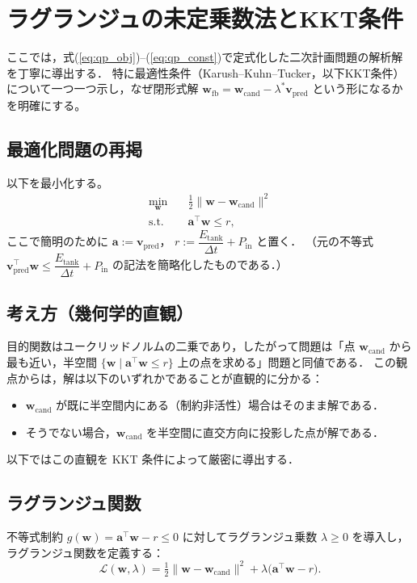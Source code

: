 \documentclass[uplatex]{jsarticle}
\begin{document}
\section{ラグランジュの未定乗数法とKKT条件}\label{sec:KKT}
ここでは，式(\ref{eq:qp_obj})--(\ref{eq:qp_const})で定式化した二次計画問題の解析解を丁寧に導出する．
特に最適性条件（Karush--Kuhn--Tucker，以下KKT条件）について一つ一つ示し，なぜ閉形式解
\(\boldsymbol{w}_{\mathrm{fb}} = \boldsymbol{w}_{\mathrm{cand}} - \lambda^\ast \boldsymbol{v}_{\mathrm{pred}}\)
という形になるかを明確にする。

\subsection{最適化問題の再掲}
以下を最小化する。
\begin{align}
 \min_{\boldsymbol{w}} \quad & \tfrac{1}{2}\|\boldsymbol{w}-\boldsymbol{w}_{\mathrm{cand}}\|^2 \label{eq:qp_obj_re}\\
 \text{s.t.}\quad & \boldsymbol{a}^\top \boldsymbol{w} \le r, \label{eq:lin_const}
\end{align}
ここで簡明のために \(\boldsymbol{a} := \boldsymbol{v}_{\mathrm{pred}}\)，
\(r := \dfrac{E_{\mathrm{tank}}}{\Delta t} + P_{\mathrm{in}}\) と置く．
（元の不等式 \( \boldsymbol{v}_{\mathrm{pred}}^\top \boldsymbol{w} \le \dfrac{E_{\mathrm{tank}}}{\Delta t} + P_{\mathrm{in}} \) の記法を簡略化したものである．）

\subsection{考え方（幾何学的直観）}
目的関数はユークリッドノルムの二乗であり，したがって問題は「点 \(\boldsymbol{w}_{\mathrm{cand}}\) から最も近い，半空間 \(\{\boldsymbol{w}\mid \boldsymbol{a}^\top\boldsymbol{w}\le r\}\) 上の点を求める」問題と同値である．
この観点からは，解は以下のいずれかであることが直観的に分かる：
\begin{itemize}
 \item \(\boldsymbol{w}_{\mathrm{cand}}\) が既に半空間内にある（制約非活性）場合はそのまま解である．
 \item そうでない場合，\(\boldsymbol{w}_{\mathrm{cand}}\) を半空間に直交方向に投影した点が解である．
\end{itemize}
以下ではこの直観を KKT 条件によって厳密に導出する．

\subsection{ラグランジュ関数}
不等式制約 \(g(\boldsymbol{w}) = \boldsymbol{a}^\top \boldsymbol{w} - r \le 0\) に対してラグランジュ乗数 \(\lambda \ge 0\) を導入し，ラグランジュ関数を定義する：
\begin{equation}
 \mathcal{L}(\boldsymbol{w},\lambda) = \tfrac{1}{2}\|\boldsymbol{w}-\boldsymbol{w}_{\mathrm{cand}}\|^2 + \lambda\big(\boldsymbol{a}^\top\boldsymbol{w} - r\big).
\end{equation}
\end{document}
